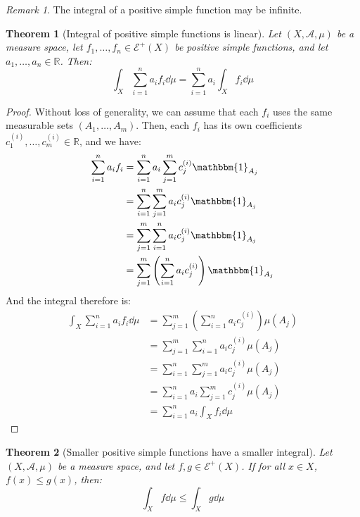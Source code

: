\documentclass{article}
\newtheorem{theorem}{Theorem}[section]
\theoremstyle{definition}
\theoremstyle{remark}
\newtheorem*{remark}{Remark}
\theoremstyle{example}
\theoremstyle{notation}
\theoremstyle{axiom}
\begin{document}
\begin{remark}
		The integral of a positive simple function may be infinite.
\end{remark}

\begin{theorem}[Integral of positive simple functions is linear]
		Let $(X, \mathcal{A}, \mu)$ be a measure space, let $f_1, \dots, f_n \in \mathcal{E}^+(X)$ be positive simple functions, and let $a_1, \dots, a_n \in \mathbb{R}$. Then:
				$$\int_X \sum_{i=1}^n a_i f_i \dd \mu = \sum_{i=1}^n a_i \int_X f_i \dd \mu$$
\end{theorem}
		
\begin{proof}
		Without loss of generality, we can assume that each $f_i$ uses the same measurable sets $(A_1, \dots, A_m)$. Then, each $f_i$ has its own coefficients $c^{(i)}_1, \dots, c^{(i)}_m \in \mathbb{R}$, and we have:
		\begin{align*}
				\sum_{i=1}^n a_i f_i &= \sum_{i=1}^n a_i \sum_{j=1}^m c^{(i)}_j \mathbbm{1}_{A_j}\\
									 &= \sum_{i=1}^n \sum_{j=1}^m a_i c^{(i)}_j \mathbbm{1}_{A_j}\\
									 &= \sum_{j=1}^m \sum_{i=1}^n a_i c^{(i)}_j \mathbbm{1}_{A_j}\\
									 &= \sum_{j=1}^m \left( \sum_{i=1}^n a_i c^{(i)}_j \right) \mathbbm{1}_{A_j}
		\end{align*}
		And the integral therefore is:
		\begin{align*}
				\int_X \sum_{i=1}^n a_i f_i \dd \mu &= \sum_{j=1}^m \left( \sum_{i=1}^n a_i c^{(i)}_j \right) \mu(A_j)\\
													&= \sum_{j=1}^m \sum_{i=1}^n a_i c^{(i)}_j \mu(A_j)\\
													&= \sum_{i=1}^n \sum_{j=1}^m a_i c^{(i)}_j \mu(A_j)\\
													&= \sum_{i=1}^n a_i \sum_{j=1}^m c^{(i)}_j \mu(A_j)\\
													&= \sum_{i=1}^n a_i \int_X f_i \dd \mu
		\end{align*}
\end{proof}


\begin{theorem}[Smaller positive simple functions have a smaller integral] \label{thm:smaller-simple-functions-smaller-integral}
		Let $(X, \mathcal{A}, \mu)$ be a measure space, and let $f, g \in \mathcal{E}^+(X)$. If for all $x \in X$, $f(x) \leq g(x)$, then:
				$$\int_X f \dd \mu \leq \int_X g \dd \mu$$
\end{theorem}
\end{document}
